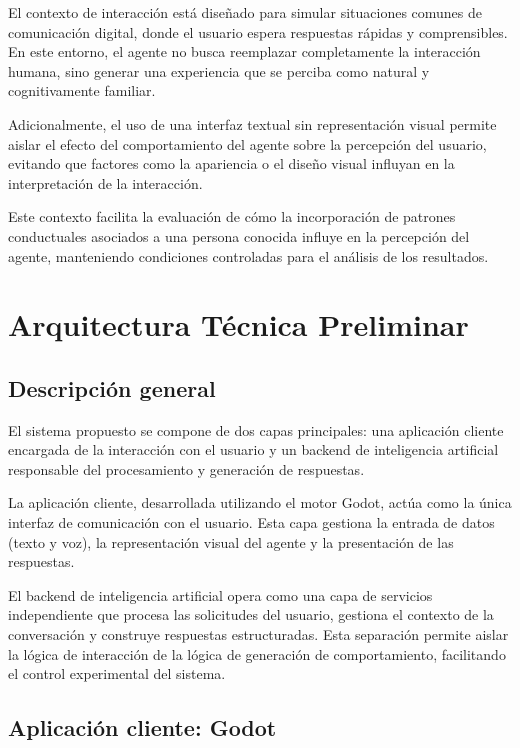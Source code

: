 \documentclass[12pt]{article}
\begin{document}
El contexto de interacción está diseñado para simular situaciones comunes de comunicación digital, donde el usuario espera respuestas rápidas y comprensibles. En este entorno, el agente no busca reemplazar completamente la interacción humana, sino generar una experiencia que se perciba como natural y cognitivamente familiar.

Adicionalmente, el uso de una interfaz textual sin representación visual permite aislar el efecto del comportamiento del agente sobre la percepción del usuario, evitando que factores como la apariencia o el diseño visual influyan en la interpretación de la interacción.

Este contexto facilita la evaluación de cómo la incorporación de patrones conductuales asociados a una persona conocida influye en la percepción del agente, manteniendo condiciones controladas para el análisis de los resultados.






\section{Arquitectura Técnica Preliminar}

\subsection{Descripción general}

El sistema propuesto se compone de dos capas principales: una aplicación cliente encargada de la interacción con el usuario y un backend de inteligencia artificial responsable del procesamiento y generación de respuestas.

La aplicación cliente, desarrollada utilizando el motor Godot, actúa como la única interfaz de comunicación con el usuario. Esta capa gestiona la entrada de datos (texto y voz), la representación visual del agente y la presentación de las respuestas.

El backend de inteligencia artificial opera como una capa de servicios independiente que procesa las solicitudes del usuario, gestiona el contexto de la conversación y construye respuestas estructuradas. Esta separación permite aislar la lógica de interacción de la lógica de generación de comportamiento, facilitando el control experimental del sistema.

\subsection{Aplicación cliente: Godot}
\end{document}
